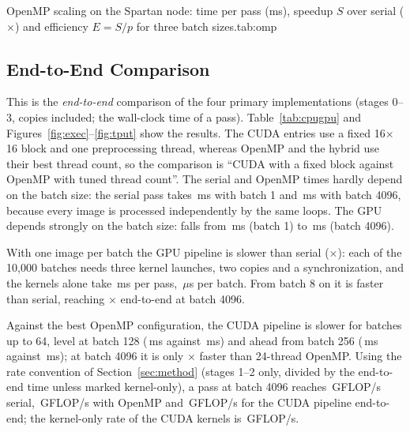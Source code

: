 \begin{widetable}{OpenMP scaling on the Spartan node: time per pass (ms), speedup $S$ over serial ($\times$) and efficiency $E=S/p$ for three batch sizes.}{tab:omp}

\end{widetable}

\subsection{End-to-End Comparison}\label{sec:e2e}

This is the \emph{end-to-end} comparison of the four primary implementations (stages 0--3, copies included; the wall-clock time of a pass). Table~\ref{tab:cpugpu} and Figures~\ref{fig:exec}--\ref{fig:tput} show the results. The CUDA entries use a fixed 16$\times$16 block and one preprocessing thread, whereas OpenMP and the hybrid use their best thread count, so the comparison is ``CUDA with a fixed block against OpenMP with tuned thread count''. The serial and OpenMP times hardly depend on the batch size: the serial pass takes \,ms with batch 1 and \,ms with batch 4096, because every image is processed independently by the same loops. The GPU depends strongly on the batch size: \cudabase{} falls from \,ms (batch 1) to \,ms (batch 4096).

With one image per batch the GPU pipeline is slower than serial ($\times$): each of the 10{,}000 batches needs three kernel launches, two copies and a synchronization, and the kernels alone take \,ms per pass, \,$\mu$s per batch. From batch 8 on it is faster than serial, reaching $\times$ end-to-end at batch 4096.

Against the best OpenMP configuration, the CUDA pipeline is slower for batches up to 64, level at batch 128 (\,ms against \,ms) and ahead from batch 256 (\,ms against \,ms); at batch 4096 it is only $\times$ faster than 24-thread OpenMP. Using the rate convention of Section~\ref{sec:method} (stages 1--2 only, divided by the end-to-end time unless marked kernel-only), a pass at batch 4096 reaches \,GFLOP/s serial, \,GFLOP/s with OpenMP and \,GFLOP/s for the CUDA pipeline end-to-end; the kernel-only rate of the CUDA kernels is \,GFLOP/s.

